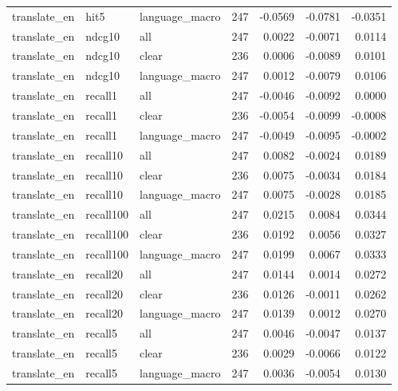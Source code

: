 \begin{tabular}{lllrrrr}
translate\_en & hit5 & language\_macro & 247 & -0.0569 & -0.0781 & -0.0351 \\
translate\_en & ndcg10 & all & 247 & 0.0022 & -0.0071 & 0.0114 \\
translate\_en & ndcg10 & clear & 236 & 0.0006 & -0.0089 & 0.0101 \\
translate\_en & ndcg10 & language\_macro & 247 & 0.0012 & -0.0079 & 0.0106 \\
translate\_en & recall1 & all & 247 & -0.0046 & -0.0092 & 0.0000 \\
translate\_en & recall1 & clear & 236 & -0.0054 & -0.0099 & -0.0008 \\
translate\_en & recall1 & language\_macro & 247 & -0.0049 & -0.0095 & -0.0002 \\
translate\_en & recall10 & all & 247 & 0.0082 & -0.0024 & 0.0189 \\
translate\_en & recall10 & clear & 236 & 0.0075 & -0.0034 & 0.0184 \\
translate\_en & recall10 & language\_macro & 247 & 0.0075 & -0.0028 & 0.0185 \\
translate\_en & recall100 & all & 247 & 0.0215 & 0.0084 & 0.0344 \\
translate\_en & recall100 & clear & 236 & 0.0192 & 0.0056 & 0.0327 \\
translate\_en & recall100 & language\_macro & 247 & 0.0199 & 0.0067 & 0.0333 \\
translate\_en & recall20 & all & 247 & 0.0144 & 0.0014 & 0.0272 \\
translate\_en & recall20 & clear & 236 & 0.0126 & -0.0011 & 0.0262 \\
translate\_en & recall20 & language\_macro & 247 & 0.0139 & 0.0012 & 0.0270 \\
translate\_en & recall5 & all & 247 & 0.0046 & -0.0047 & 0.0137 \\
translate\_en & recall5 & clear & 236 & 0.0029 & -0.0066 & 0.0122 \\
translate\_en & recall5 & language\_macro & 247 & 0.0036 & -0.0054 & 0.0130 \\
\bottomrule
\end{tabular}
